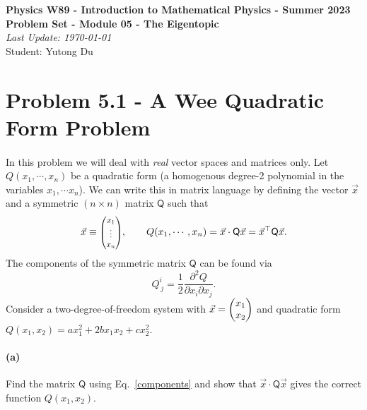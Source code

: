 \documentclass{article}
\begin{document}
\addcopyright
\begin{center}
{\bf \large Physics W89 - Introduction to Mathematical Physics - Summer 2023}\\\medskip
{\bf \large Problem Set - Module 05 - The Eigentopic} \\\medskip
{\emph{Last Update: \today}\\}
{ Student: Yutong Du}
\end{center}


\dphline\bigskip
\section*{Problem 5.1 - A Wee Quadratic Form Problem}

\paragraph{}
In this problem we will deal with \emph{real} vector spaces and matrices only.
Let $Q(x_{1},\cdots,x_{n})$ be a quadratic form (a homogenous degree-2 polynomial in the variables $x_{1}, \cdots x_{n}$).  
We can write this in matrix language by defining the vector $\vec{x}$ and a symmetric $(n\times n)$ matrix $\mathsf{Q}$ such that 
	\begin{equation}
		\vec{x} \equiv \smmatrix{0.8}{x_{1}\\\vdots\\x_{n}},	\qquad Q(x_{1},\cdots,x_{n}) = \vec{x}\cdot\mathsf{Q}\vec{x} = \vec{x}^{\T}\mathsf{Q}\vec{x}.
	\label{quadratic}
	\end{equation}
The components of the symmetric matrix $\mathsf{Q}$ can be found via
	\begin{equation}
		Q^{i}_{\,j} = \frac{1}{2}\frac{\partial^{2}Q}{\partial{x_{i}}\partial{x_{j}}}.
	\label{components}
	\end{equation}
Consider a two-degree-of-freedom system with $\vec{x} =\begin{pmatrix} x_{1}\\ x_{2} \end{pmatrix}$ and quadratic form $Q(x_{1},x_{2}) = ax_{1}^{2} + 2bx_{1}x_{2}+cx_{2}^{2}$.

\paragraph{(a)}
Find the matrix $\mathsf{Q}$ using Eq.~\ref{components} and show that $\vec{x}\cdot\mathsf{Q}\vec{x}$ gives the correct function $Q(x_{1},x_{2})$.
\end{document}
